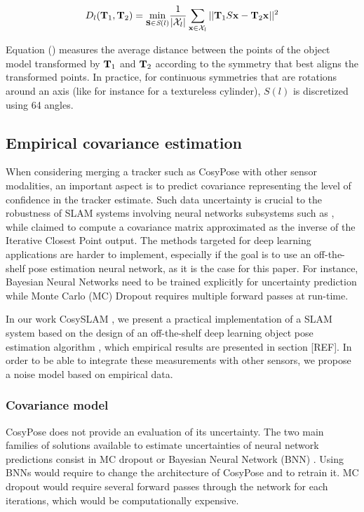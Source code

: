 \begin{equation}
    D_l({\bf T}_1, {\bf T}_2) = \underset{{\bf S} \in \textit{S}(l)}{\text{min}} \frac{1}{|\mathcal{X}_l|} \sum_{\mathbf{x} \in \mathcal{X}_l} ||{\bf T}_1 S\mathbf{x} - {\bf T}_2\mathbf{x} ||^2
    \label{eq:distSym}
\end{equation}

Equation () measures the average distance between the points of the object model transformed by ${\bf T}_1$ and ${\bf T}_2$ according to the symmetry 
that best aligns the transformed points. In practice, for continuous symmetries  that are rotations around an axis (like for instance for a textureless cylinder), 
$S(l)$ is discretized using 64 angles.


\subsection{Empirical covariance estimation}

When considering merging a tracker such as CosyPose with other sensor modalities, an important aspect is to predict covariance representing the level 
of confidence in the tracker estimate. Such data uncertainty is crucial to the robustness of SLAM systems involving neural networks 
subsystems such as \cite{yang2020d3vo}, while \cite{SalasMoreno2013SLAMSL} claimed to compute a covariance matrix approximated as the inverse of the 
Iterative Closest Point output. The methods targeted for deep learning applications are harder to implement, especially if the goal 
is to use an off-the-shelf pose estimation neural network, as it is the case for this paper. For instance, Bayesian Neural Networks \cite{jospin2020hands} 
need to be trained explicitly for uncertainty prediction while Monte Carlo (MC) Dropout \cite{gal2016dropout} requires multiple forward passes at run-time.

In our work CosySLAM \cite{debeunne2021cosyslam}, we present a practical implementation of a SLAM system based on the design of an off-the-shelf deep learning object 
pose estimation algorithm \cite{labbe2020cosypose}, which empirical results are presented in section [REF]. 
In order to be able to integrate these measurements with other sensors, we propose a noise model based on empirical data.

\subsubsection{Covariance model}

CosyPose does not provide an evaluation of its uncertainty.
%
The two main families of solutions available to estimate uncertainties of neural network predictions consist in MC dropout \cite{gal2016dropout} 
or Bayesian Neural Network (BNN) \cite{jospin2020hands}. Using BNNs would require to change the architecture of CosyPose and to retrain it. 
MC dropout would require several forward passes through the network for each iterations, which would be computationally expensive. 

